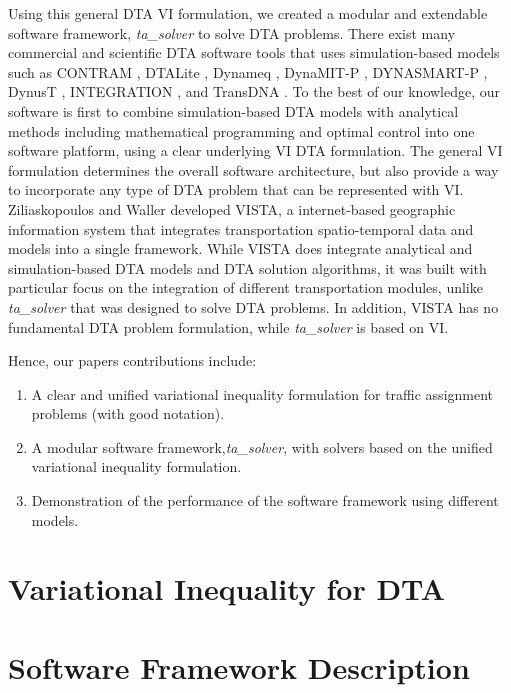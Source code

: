 \documentclass[conference]{IEEEtran}
\renewcommand{\:}{\mathrel{\coloneqq}}
\renewcommand{\=}{\ensuremath{\eqqcolon}}
\newcommand{\0}{\ensuremath{\boldsymbol{0}}}
\begin{document}
Using this general DTA VI formulation, we created a modular and extendable software framework, \textit{ta\_solver} to solve DTA problems. There exist many commercial and scientific DTA software tools that uses simulation-based models such as CONTRAM \cite{taylor2003contram}, DTALite \cite{zhou2014dtalite}, Dynameq \cite{mahut2010traffic}, DynaMIT-P \cite{DynaMIT,ben2001dynamit}, DYNASMART-P \cite{DYNASMART,mahmassani2004dynasmart}, DynusT \cite{chiu2011dynust}, INTEGRATION \cite{rakha2012integration}, and TransDNA \cite{TransDNA}. To the best of our knowledge, our software is first to combine simulation-based DTA models with analytical methods including mathematical programming and optimal control into one software platform, using a clear underlying VI DTA formulation. The general VI formulation determines the overall software architecture, but also provide a way to incorporate any type of DTA problem that can be represented with VI. Ziliaskopoulos and Waller developed VISTA, a internet-based geographic information system that integrates transportation spatio-temporal data and models into a single framework. While VISTA does integrate analytical and simulation-based DTA models and DTA solution algorithms, it was built with particular focus on the integration of different transportation modules, unlike \textit{ta\_solver} that was designed to solve DTA problems. In addition, VISTA has no fundamental DTA problem formulation, while \textit{ta\_solver} is based on VI. 

Hence, our papers contributions include:
\begin{enumerate}
    \item A clear and unified variational inequality formulation for traffic assignment problems (with good notation).
    \item A modular software framework,\textit{ta\_solver},  with solvers based on the unified variational inequality formulation.
    \item Demonstration of the performance of the software framework using different models.
\end{enumerate}

\section{Variational Inequality for DTA}

\section{Software Framework Description}
\end{document}
